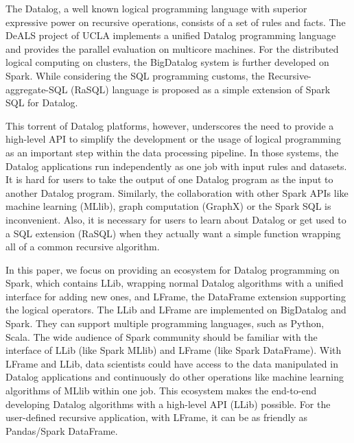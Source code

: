 The Datalog, a well known logical programming language with superior expressive power on recursive operations, consists of a set of rules and facts. The DeALS project of UCLA \citep{yang2015parallel} implements a unified Datalog programming language and provides the parallel evaluation on multicore machines. For the distributed logical computing on clusters, the BigDatalog \citep{shkapsky2016big} system is further developed on Spark. While considering the SQL programming customs, the Recursive-aggregate-SQL (RaSQL) \citep{gu2019rasql} language is proposed as a simple extension of Spark SQL for Datalog.  


This torrent of Datalog platforms, however, underscores the need to provide a high-level API to simplify the development or the usage of logical programming as an important step within the data processing pipeline. In those systems, the Datalog applications run independently as one  job with input rules and datasets. It is hard for users to take the output of one Datalog program as the input to another Datalog program. Similarly, the collaboration with other Spark APIs like machine learning (MLlib), graph computation (GraphX) or the Spark SQL is inconvenient. Also, it is necessary for users to learn about Datalog or get used to a SQL extension (RaSQL) when they actually  want a simple function wrapping all of  a common recursive  algorithm. 


In this paper, we focus on providing an ecosystem for Datalog programming on Spark, which contains LLib, wrapping normal Datalog algorithms with a unified interface for adding new ones, and LFrame, the DataFrame extension supporting the logical operators.  The LLib and LFrame are implemented on BigDatalog and Spark. They can support multiple programming languages, such as Python, Scala. The wide audience of Spark community should be familiar with the interface of LLib (like Spark MLlib) and LFrame (like Spark DataFrame). With LFrame and LLib, data scientists could have access to the data manipulated in Datalog applications and  continuously do other operations like machine learning algorithms of MLlib  within one job. 
This ecosystem makes the end-to-end developing Datalog algorithms with a high-level API (LLib) possible. For the user-defined recursive application, with LFrame, it can be as friendly as Pandas\citep{mckinney2010data}/Spark DataFrame. 

